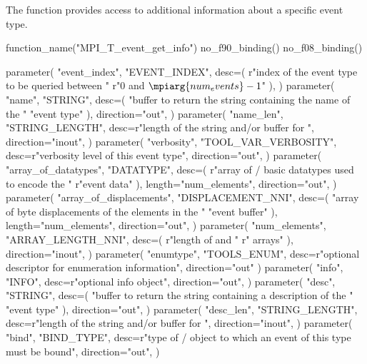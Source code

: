 The function  provides access to
additional information about a specific event type.

\begin{mpi-binding}
    function_name("MPI_T_event_get_info")
    no_f90_binding()
    no_f08_binding()

    parameter(
        "event_index",
        "EVENT_INDEX",
        desc=(
            r"index of the event type to be queried between "
            r"$0$ and $\mpiarg{num_events}-1$"
        ),
    )
    parameter(
        "name",
        "STRING",
        desc=(
            "buffer to return the string containing the name of the "
            "event type"
        ),
        direction="out",
    )
    parameter(
        "name_len",
        "STRING_LENGTH",
        desc=r"length of the string and/or buffer for ",
        direction="inout",
    )
    parameter(
        "verbosity",
        "TOOL_VAR_VERBOSITY",
        desc=r"verbosity level of this event type",
        direction="out",
    )
    parameter(
        "array_of_datatypes",
        "DATATYPE",
        desc=(
            r"array of \mpi/ basic datatypes used to encode the "
            r"event data"
        ),
        length="num_elements",
        direction="out",
    )
    parameter(
        "array_of_displacements",
        "DISPLACEMENT_NNI",
        desc=(
            "array of byte displacements of the elements in the "
            "event buffer"
        ),
        length="num_elements",
        direction="out",
    )
    parameter(
        "num_elements",
        "ARRAY_LENGTH_NNI",
        desc=(
            r"length of  and "
            r" arrays"
        ),
        direction="inout",
    )
    parameter(
        "enumtype",
        "TOOLS_ENUM",
        desc=r"optional descriptor for enumeration information",
        direction="out"
    )
    parameter(
        "info",
        "INFO",
        desc=r"optional info object",
        direction="out",
    )
    parameter(
        "desc",
        "STRING",
        desc=(
            "buffer to return the string containing a description of the "
            "event type"
        ),
        direction="out",
    )
    parameter(
        "desc_len",
        "STRING_LENGTH",
        desc=r"length of the string and/or buffer for ",
        direction="inout",
    )
    parameter(
        "bind",
        "BIND_TYPE",
        desc=r"type of \mpi/ object to which an event of this type must be bound",
        direction="out",
    )

\end{mpi-binding}

